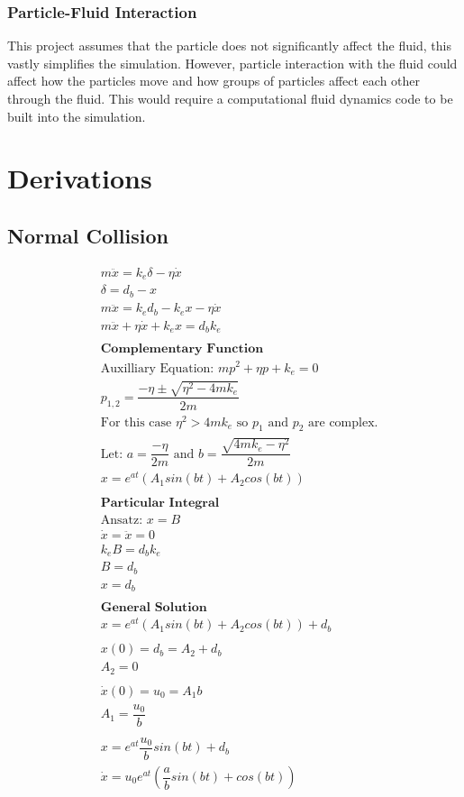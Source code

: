 \documentclass[10pt,a4paper,titlepage]{report}
\begin{document}
\subsection{Particle-Fluid Interaction}
This project assumes that the particle does not significantly affect the fluid, this vastly simplifies the simulation. However, particle interaction with the fluid could affect how the particles move and how groups of particles affect each other through the fluid. This would require a computational fluid dynamics code to be built into the simulation.
\appendix
\chapter{Derivations}
\label{ch:Derivations}
\section{Normal Collision}
\label{der:normal collision}
\begin{align*}
&m \ddot{x} = k_e \delta - \eta \dot{x} \\
&\delta = d_b - x \\
&m \ddot{x} = k_e d_b - k_e x - \eta \dot{x} \\
&m \ddot{x} + \eta \dot{x} + k_e x = d_b k_e \\\\
&\textbf{Complementary Function} \\
&\text{Auxilliary Equation: } mp^2 + \eta p + k_e = 0 \\
&p_{1,2} = \dfrac{- \eta \pm \sqrt{\eta^2 - 4 m k_e}}{2 m} \\
&\text{For this case $\eta ^ 2 > 4 m k_e$ so $p_1$ and $p_2$ are complex.} \\
&\text{Let: } a = \dfrac{-\eta}{2m} \text{ and } b = \dfrac{\sqrt{4mk_e - \eta ^ 2}}{2m} \\
&x = e^{at} (A_1 sin(bt) + A_2 cos(bt)) \\\\
&\textbf{Particular Integral} \\
&\text{Ansatz: } x = B \\
&\dot{x} = \ddot{x} = 0 \\
&k_e B = d_b k_e \\
&B = d_b \\
&x = d_b \\\\
&\textbf{General Solution} \\
&x = e^{at} (A_1 sin(bt) + A_2 cos(bt)) + d_b \\\\
&x(0) = d_b = A_2 + d_b \\
&A_2 = 0 \\\\
&\dot{x}(0) = u_0 = A_1 b \\
&A_1 = \dfrac{u_0}{b} \\\\
&x = e^{at} \dfrac{u_0}{b} sin(bt) + d_b \\
&\dot{x} = u_0 e^{at} (\dfrac{a}{b} sin(bt) + cos(bt))
\end{align*}
\end{document}
